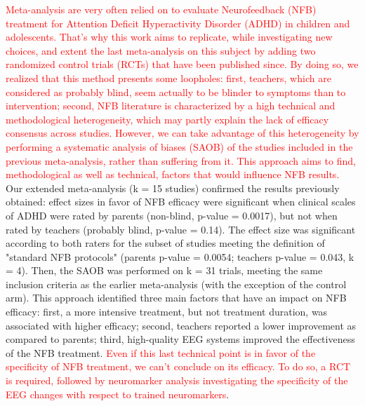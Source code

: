 

\noindent \textcolor{red}{Meta-analysis are very often relied on to evaluate Neurofeedback (NFB) treatment for Attention Deficit 
Hyperactivity Disorder (ADHD) in children and adolescents. That’s why this work aims to replicate, while investigating 
new choices, and extent the last meta-analysis on this subject \citep{Cortese2016} by adding two randomized 
control trials (RCTs) that have been published since. By doing so, we realized that this method presents some 
loopholes: first, teachers, which are considered as probably blind, seem actually to be blinder to symptoms 
than to intervention; second, NFB literature is characterized by a high technical and methodological heterogeneity, 
which may partly explain the lack of efficacy consensus across studies. However, we can take advantage of this 
heterogeneity by performing a systematic analysis of biases (SAOB) of the studies included in the previous meta-analysis, 
rather than suffering from it. This approach aims to find, methodological as well as technical, factors that would 
influence NFB results.} Our extended meta-analysis (k = 15 studies) confirmed the results previously obtained: effect sizes 
in favor of NFB efficacy were significant when clinical scales of ADHD were rated by parents (non-blind, p-value = 0.0017), 
but not when rated by teachers (probably blind, p-value = 0.14). The effect size was significant according to both raters for 
the subset of studies meeting the definition of "standard NFB protocols" (parents p-value = 0.0054; teachers p-value = 0.043, k = 4). 
Then, the SAOB was performed on k = 31 trials, meeting the same inclusion criteria as the earlier meta-analysis (with the exception 
of the control arm). This approach identified three main factors that have an impact on NFB efficacy: first, a more intensive treatment, 
but not treatment duration, was associated with higher efficacy; second, teachers reported a lower improvement as compared to parents; 
third, high-quality EEG systems improved the effectiveness of the NFB treatment. \textcolor{red}{Even if this last technical point is in favor of the 
specificity of NFB treatment, we can’t conclude on its efficacy. To do so, a RCT is required, followed by neuromarker analysis 
investigating the specificity of the EEG changes with respect to trained neuromarkers}. 

